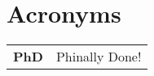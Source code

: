 \chapter*{Acronyms}

  \begin{longtable}{p{2.0cm}p{10.0cm}}
    {\bf PhD}       & Phinally Done!
  \end{longtable}
